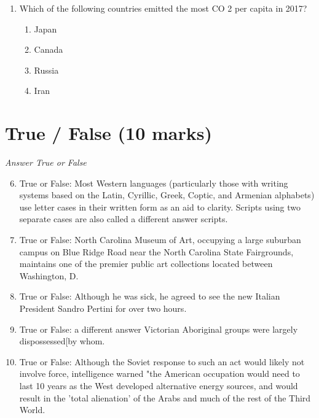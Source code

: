 \documentclass[12pt]{article}
\begin{document}
\begin{enumerate}[label=\arabic*.]
\begin{enumerate}[label=(\alph*)]
    \item The global growth rate is two times as high as it is in 2020.
    \item The global growth rate is four times as high today as it is in 2020.
\end{enumerate}
\item Which of the following countries emitted the most CO 2 per capita in 2017?
\begin{enumerate}[label=(\alph*)]
    \item Japan
    \item Canada
    \item Russia
    \item Iran
\end{enumerate}
\end{enumerate}

\section*{True / False (10 marks)}
\textit{Answer True or False}
\begin{enumerate}[label=\arabic*.]
\setcounter{enumi}{5}
\item True or False: Most Western languages (particularly those with writing systems based on the Latin, Cyrillic, Greek, Coptic, and Armenian alphabets) use letter cases in their written form as an aid to clarity. Scripts using two separate cases are also called a different answer scripts.
\item True or False: North Carolina Museum of Art, occupying a large suburban campus on Blue Ridge Road near the North Carolina State Fairgrounds, maintains one of the premier public art collections located between Washington, D.
\item True or False: Although he was sick, he agreed to see the new Italian President Sandro Pertini for over two hours.
\item True or False: a different answer Victorian Aboriginal groups were largely dispossessed[by whom.
\item True or False: Although the Soviet response to such an act would likely not involve force, intelligence warned "the American occupation would need to last 10 years as the West developed alternative energy sources, and would result in the 'total alienation' of the Arabs and much of the rest of the Third World.
\end{enumerate}
\end{document}
